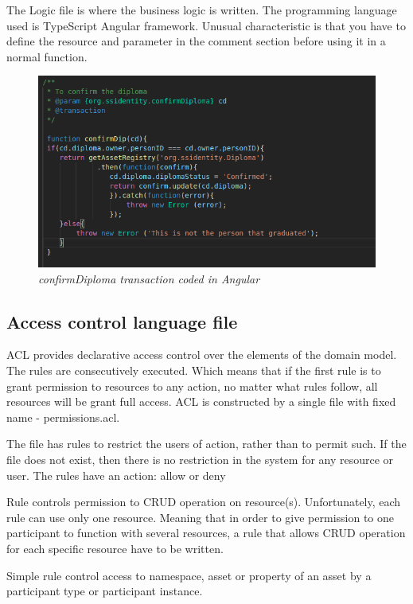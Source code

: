 \documentclass[a4paper,11pt]{report}
\begin{document}
The Logic file is where the business logic is written. The programming language used is TypeScript Angular framework. Unusual characteristic is that you have to define the resource and parameter in the comment section before using it in a normal function. 

\begin{figure}[h]
\centering
  \includegraphics[width = 12cm]{confirmdip.png}
  \caption{\textit{confirmDiploma transaction coded in Angular}}
  \label{transactionlogicfile}
\end{figure}

\subsection{Access control language file}
ACL provides declarative access control over the elements of the domain model. The rules are consecutively executed. Which means that if the first rule is to grant permission to resources to any action, no matter what rules follow, all resources will be grant full access. ACL is constructed by a single file with fixed name - permissions.acl. 

The file has rules to restrict the users of action, rather than to permit such. If the file does not exist, then there is no restriction in the system for any resource or user. The rules have an action: allow or deny

Rule controls permission to CRUD operation on resource(s). Unfortunately, each rule can use only one resource. Meaning that in order to give permission to one participant to function with several resources, a rule that allows CRUD operation for each specific resource have to be written.  

Simple rule control access to namespace, asset or property of an asset by a participant type or participant instance.
\end{document}
